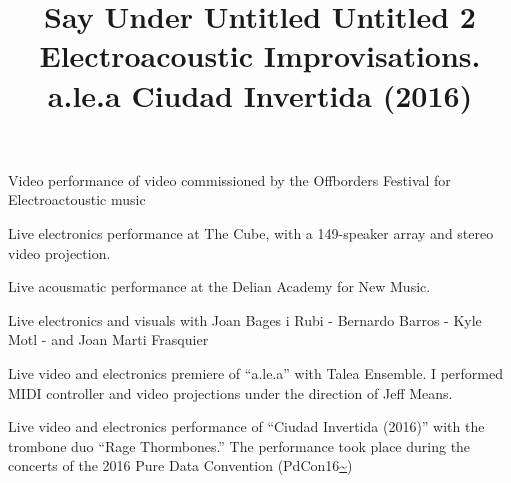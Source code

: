 

 \title{ Say Under}
 \begin{position}
{ Video performance of video commissioned by the Offborders Festival for Electroactoustic music}
\end{position}

 \title{ Untitled}
 \begin{position}
{ Live electronics performance at The Cube, with a 149-speaker array and stereo video projection. }
\end{position}

 \title{ Untitled 2}
 \begin{position}
{ Live acousmatic performance at the Delian Academy for New Music.}
\end{position}

 \title{ Electroacoustic Improvisations.}
 \begin{position}
{ Live electronics and visuals with Joan Bages i Rubi - Bernardo Barros - Kyle Motl - and Joan Marti Frasquier}
\end{position}

 \title{ a.le.a}
 \begin{position}
{ Live video and electronics premiere of ``a.le.a'' with Talea Ensemble. I performed MIDI controller and video projections under the direction of Jeff Means. }
\end{position}

 \title{ Ciudad Invertida (2016) }
 \begin{position}
{ Live video and electronics performance of ``Ciudad Invertida (2016)'' with the trombone duo ``Rage Thormbones.'' The performance took place during the concerts of the 2016 Pure Data Convention (PdCon16\url{~}) }
\end{position}


